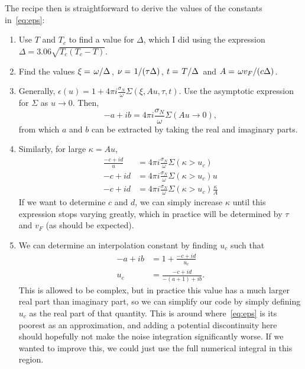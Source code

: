 \documentclass[11pt]{article}
\begin{document}
	The recipe then is straightforward to derive the values of the constants in~\eqref{eq:eps}:
	\begin{enumerate}
		\item Use $T$ and $T_c$ to find a value for $\Delta$, which I did using the expression $\Delta = 3.06 \sqrt{T_c(T_c - T)}$.
		\item Find the values $\xi = \flatfrac{\omega}{\Delta}$, $\nu = \flatfrac{1}{(\tau \Delta)}$,  $t = \flatfrac{T}{\Delta}$ and $A = \flatfrac{\omega v_F}{(c \Delta)}$.
		\item Generally, $\epsilon(u) = 1 + 4 \pi i \frac{\sigma_N}{\omega} \Sigma(\xi, A u, \tau, t)$.
			Use the asymptotic expression for $\Sigma$ as $u \rightarrow 0$.
			Then,
			\begin{equation}
				-a + ib = 4 \pi i \frac{\sigma_N}{\omega} \Sigma(A u \rightarrow 0),
			\end{equation}
			from which $a$ and $b$ can be extracted by taking the real and imaginary parts.
		\item Similarly, for large $\kappa = A u$,
			\begin{align}
				\frac{-c + i d}{u} &= 4 \pi i \frac{\sigma_N}{\omega} \Sigma(\kappa > u_c) \\
				- c + i d &= 4 \pi i \frac{\sigma_N}{\omega} \Sigma(\kappa > u_c) u \\
				- c + i d &= 4 \pi i \frac{\sigma_N}{\omega} \Sigma(\kappa > u_c) \frac{\kappa}{A}
			\end{align}
			If we want to determine $c$ and $d$, we can simply increase $\kappa$ until this expression stops varying greatly, which in practice will be determined by $\tau$ and $v_F$ (as should be expected).
		\item We can determine an interpolation constant by finding $u_c$ such that
			\begin{align}
				-a + ib &= 1 + \frac{-c + id}{u_c} \\
				u_c &= \frac{-c + id}{-(a + 1) + ib}.
			\end{align}
			This is allowed to be complex, but in practice this value has a much larger real part than imaginary part, so we can simplify our code by simply defining $u_c$ as the real part of that quantity.
			This is around where~\eqref{eq:eps} is its poorest as an approximation, and adding a potential discontinuity here should hopefully not make the noise integration significantly worse.
			If we wanted to improve this, we could just use the full numerical integral in this region.
	\end{enumerate}
\end{document}
